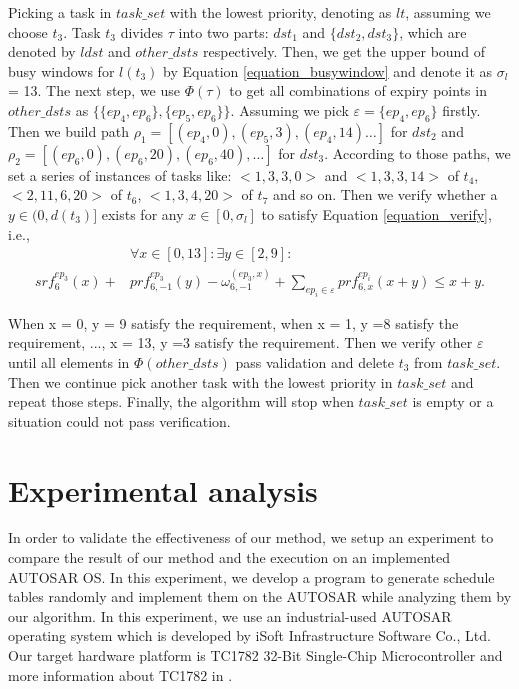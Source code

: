 \documentclass[conference]{IEEEtran}
\begin{document}
Picking a task in $task\_set$ with the lowest priority, denoting as $lt$, assuming we choose $t_3$. Task $t_3$ divides $\tau$ into two parts: $dst_1$ and $\{dst_2,dst_3\}$, which are denoted by $ldst$ and $other\_dsts$ respectively. Then, we get the upper bound of busy windows for $l(t_3)$ by Equation \ref{equation_busywindow} and denote it as $\sigma_l$ = 13. The next step, we use $\Phi(\tau)$ to get all combinations of expiry points in $other\_dsts$ as $\{\{ep_4,ep_6\},\{ep_5,ep_6\}\}$. Assuming we pick $\varepsilon=\{ep_4,ep_6\}$ firstly. Then we build path $\rho_1=[(ep_4,0),(ep_5,3),(ep_4,14)\dots]$ for $dst_2$ and $\rho_2=[(ep_6,0),(ep_6,20),(ep_6,40),\dots]$ for $dst_3$. According to those paths, we set a series of instances of tasks like: $<1,3,3,0>$ and $<1,3,3,14>$ of $t_4$, $<2,11,6,20>$ of $t_6$, $<1,3,4,20>$ of $t_7$ and so on. Then we verify whether a $y\in(0,d(t_3)]$ exists for any $x\in[0,\sigma_l]$ to satisfy Equation \ref{equation_verify}, i.e.,
\[\begin{split}
&\forall x\in[0,13]:\exists y\in[2,9]:\\
srf^{ep_3}_6(x)+&prf^{ep_3}_{6,-1}(y)-\omega^{(ep_3,x)}_{6,-1}+\sum\limits_{ep_i\in \varepsilon}prf^{ep_i}_{6,x}(x+y)\leq x+y.
\end{split}\]


When x = 0, y = 9 satisfy the requirement, when x = 1, y =8 satisfy the requirement, ..., x = 13, y =3 satisfy the requirement. Then we verify other $\varepsilon$ until all elements in $\Phi(other\_dsts)$ pass validation and delete $t_3$ from $task\_set$. Then we continue pick another task with the lowest priority in $task\_set$ and repeat those steps. Finally, the algorithm will stop when $task\_set$ is empty or a situation could not pass verification.


\section{Experimental analysis}
In order to validate the effectiveness of our method, we setup an experiment to compare the result of our method and the execution on an implemented AUTOSAR OS. In this experiment, we develop a program to generate schedule tables randomly and implement them on the AUTOSAR while analyzing them by our algorithm. In this experiment, we use an industrial-used AUTOSAR operating system which is developed by iSoft Infrastructure Software Co., Ltd. Our target hardware platform is TC1782 32-Bit Single-Chip Microcontroller and more information about TC1782 in \cite{infineon.org}. 
\end{document}
